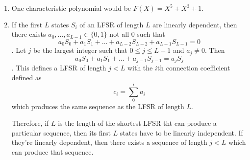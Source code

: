 \begin{enumerate}
\item One characteristic polynomial would be $F(X) = X^5 + X^3 + 1$.

\item If the first $L$ states $S_i$ of an LFSR of length $L$ are linearly
dependent, then there exists $a_0, \dots, a_{L-1} \in \{0, 1\}$ not all $0$
such that \[a_0 S_0 + a_1 S_1 + \dots + a_{L-2} S_{L-2} + a_{L-1} S_{L-1} = 0\].
Let $j$ be the largest integer such that $0 \leq j \leq L-1$ and $a_j \neq 0$. Then
\[a_0 S_0 + a_1 S_1 + \dots + a_{j-1} S_{j-1} = a_j S_j\].  This defines a LFSR
of length $j < L$ with the $i$th connection coefficient defined as \[c_i =
\sum_0^i a_i\] which produces the same sequence as the LFSR of length $L$. 

Therefore, if $L$ is the length of the shortest LFSR tht can produce a
particular sequence, then its first $L$ states have to be linearly independent.
If they're linearly dependent, then there exists a sequence of length $j < L$
which can produce that sequence. 

\end{enumerate}
